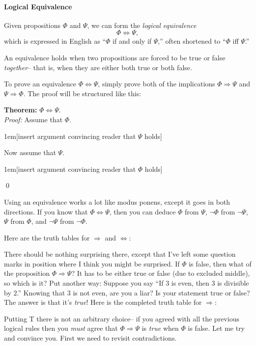 \documentclass[12pt]{article}
\newcommand{\ARR}{\Rightarrow}
\newcommand{\DARR}{\Leftrightarrow}
\newcounter{rule}
\newcommand{\indented}[1]{\begin{adjustwidth}{1em}{}#1\end{adjustwidth}}
\newcommand{\THM}[2]{\textbf{Theorem:} #1\\[0.5em]\textit{Proof:} #2\qed}
\def\pA{\Phi}
\def\pB{\Psi}
\begin{document}
\paragraph{Logical Equivalence}
Given  propositions $\pA$ and $\pB$, we can form the \emph{logical equivalence}
$$
\pA\DARR\pB,
$$
which is expressed in English as ``$\pA$ if and only if $\pB$,'' often shortened to ``$\pA$ iff $\pB$.''

An equivalence holds when two propositions are forced to be true or false \emph{together}--
that is, when they are either both true or both false.

To prove an equivalence $\pA\DARR\pB$, simply prove both of the implications $\pA\ARR\pB$ and $\pB\ARR\pA$.
The proof will be structured like this:

\THM{$\pA\DARR\pB$.}{
Assume that $\pA$.
\indented{[insert argument convincing reader that $\pB$ holds]}
Now assume that $\pB$.
\indented{[insert argument convincing reader that $\pA$ holds]}
}

Using an equivalence works a lot like modus ponens, except it goes in both directions.
If you know that $\pA\DARR\pB$, then you can deduce $\pA$ from $\pB$, $\neg\pA$ from $\neg\pB$,
$\pB$ from $\pA$, and $\neg\pB$ from $\neg\pA$.



\def\sp{\hspace{1em}}

Here are the truth tables for $\ARR$ and $\DARR$:
\begin{center}
\truthtablefour{$\pA\ARR\pB$}{???}{???}{F}{T}
\sp
\truthtablefour{$\pA\DARR\pB$}{T}{F}{F}{T}
\end{center}
There should be nothing surprising there, except that I've left some question marks in position where I think you might be surprised.
If $\pA$ is false, then what of the proposition $\pA\ARR\pB$?
It has to be either true or false (due to excluded middle), so which is it?
Put another way: Suppose you say ``If $3$ is even, then $3$ is divisible by $2$.''
Knowing that $3$ is not even, are you a liar? Is your statement true or false?
The answer is that it's \emph{true}!
Here is the completed truth table for $\ARR$:
\begin{center}
\truthtablefour{$\pA\ARR\pB$}{T}{T}{F}{T}
\end{center}
Putting T there is not an arbitrary choice-- if you agreed with all the previous logical rules then you \emph{must} agree
that $\pA\ARR\pB$ is \emph{true} when $\pA$ is false.
Let me try and convince you. First we need to revisit contradictions.
\end{document}
